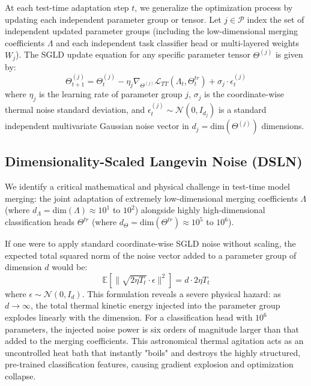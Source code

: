 At each test-time adaptation step $t$, we generalize the optimization process by updating each independent parameter group or tensor.
Let $j \in \mathcal{P}$ index the set of independent updated parameter groups (including the low-dimensional merging coefficients $\Lambda$ and each independent task classifier head or multi-layered weights $W_j$).
The SGLD update equation for any specific parameter tensor $\Theta^{(j)}$ is given by:
\begin{equation}
    \label{eq:sgld_generic}
    \Theta^{(j)}_{t+1} = \Theta^{(j)}_t - \eta_j \nabla_{\Theta^{(j)}} \mathcal{L}_{TT}(\Lambda_t, \Theta^{tr}_t) + \sigma_j \cdot \epsilon^{(j)}_t
\end{equation}
where $\eta_j$ is the learning rate of parameter group $j$, $\sigma_j$ is the coordinate-wise thermal noise standard deviation, and $\epsilon^{(j)}_t \sim \mathcal{N}(0, I_{d_j})$ is a standard independent multivariate Gaussian noise vector in $d_j = \text{dim}(\Theta^{(j)})$ dimensions.

\subsection{Dimensionality-Scaled Langevin Noise (DSLN)}
We identify a critical mathematical and physical challenge in test-time model merging: the joint adaptation of extremely low-dimensional merging coefficients $\Lambda$ (where $d_{\Lambda} = \text{dim}(\Lambda) \approx 10^1$ to $10^2$) alongside highly high-dimensional classification heads $\Theta^{tr}$ (where $d_{\Theta} = \text{dim}(\Theta^{tr}) \approx 10^5$ to $10^6$).

If one were to apply standard coordinate-wise SGLD noise without scaling, the expected total squared norm of the noise vector added to a parameter group of dimension $d$ would be:
\begin{equation}
    \mathbb{E}\left[\|\sqrt{2 \eta T_t} \cdot \epsilon\|^2\right] = d \cdot 2 \eta T_t
\end{equation}
where $\epsilon \sim \mathcal{N}(0, I_d)$.
This formulation reveals a severe physical hazard: as $d \to \infty$, the total thermal kinetic energy injected into the parameter group explodes linearly with the dimension.
For a classification head with $10^6$ parameters, the injected noise power is six orders of magnitude larger than that added to the merging coefficients.
This astronomical thermal agitation acts as an uncontrolled heat bath that instantly "boils" and destroys the highly structured, pre-trained classification features, causing gradient explosion and optimization collapse.

